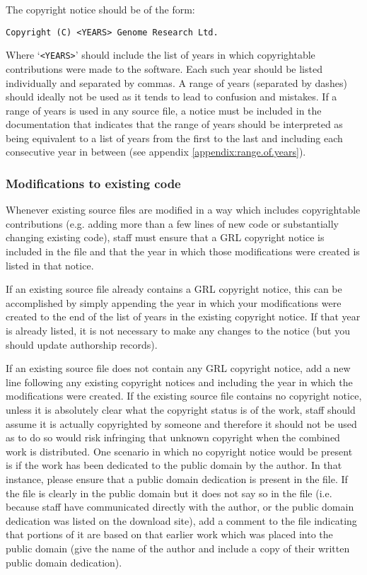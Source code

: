 \documentclass[10pt,a4paper]{article}
\begin{document}
\par The copyright notice should be of the form: 
\begin{verbatim}
Copyright (C) <YEARS> Genome Research Ltd.
\end{verbatim}

\par Where `\texttt{<YEARS>}' should include the list of years in which copyrightable 
contributions \cite{define:copyrightable} were made to the software. Each such year 
should be listed individually and separated by commas. A range of years (separated 
by dashes) should ideally not be used as it tends to lead to confusion and mistakes. 
If a range of years is used in any source file, a notice must be included in the 
documentation that indicates that the range of years should be interpreted as being 
equivalent to a list of years from the first to the last and including each consecutive 
year in between (see appendix \ref{appendix:range.of.years}). 

\subsubsection{Modifications to existing code}
\par Whenever existing source files are modified in a way which includes copyrightable 
contributions (e.g. adding more than a few lines of new code or substantially changing 
existing code), staff must ensure that a GRL copyright notice is included in the file 
and that the year in which those modifications were created is listed in that notice. 

\par If an existing source file already contains a GRL copyright notice, this can be 
accomplished by simply appending the year in which your modifications were created 
to the end of the list of years in the existing copyright notice. If that year is already 
listed, it is not necessary to make any changes to the notice (but you should update 
authorship records). 

\par If an existing source file does not contain any GRL copyright notice, add a 
new line following any existing copyright notices and including the year in which 
the modifications were created. If the existing source file contains no copyright 
notice, unless it is absolutely clear what the copyright status is of the work, staff 
should assume it is actually copyrighted by someone and therefore it should not 
be used as to do so would risk infringing that unknown copyright when the 
combined work is distributed. One scenario in which no copyright notice would be 
present is if the work has been dedicated to the public domain by the author. In 
that instance, please ensure that a public domain dedication is present in the file. 
If the file is clearly in the public domain but it does not say so in the file (i.e. because 
staff have communicated directly with the author, or the public domain dedication was 
listed on the download site), add a comment to the file indicating that portions of it 
are based on that earlier work which was placed into the public domain (give the 
name of the author and include a copy of their written public domain dedication). 
\end{document}
